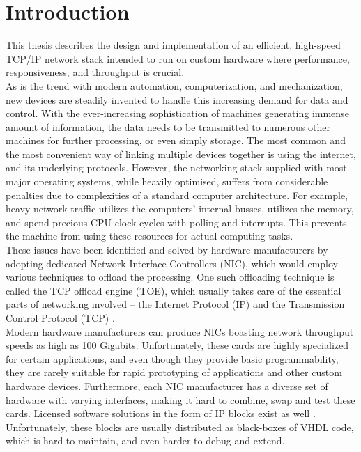 \chapter{Introduction}
This thesis describes the design and implementation of an efficient, high-speed
TCP/IP network stack intended to run on custom hardware where performance, responsiveness,
and throughput is crucial.\\

As is the trend with modern automation, computerization, and mechanization, new
devices are steadily invented to handle this increasing demand for data and
control.
With the ever-increasing sophistication of machines generating immense amount
of information, the data needs to be transmitted to numerous other machines for
further processing, or even simply storage. The most common and the most convenient
way of linking multiple devices together is using the internet, and its underlying
protocols. However, the networking stack supplied with most major operating
systems, while heavily optimised, suffers from considerable penalties due to
complexities of a standard computer architecture. For example, heavy network
traffic utilizes the computers' internal busses, utilizes the memory, and spend
precious CPU clock-cycles with polling and interrupts. This
prevents the machine from using these resources for actual computing tasks.\\
These issues have been identified and solved by hardware manufacturers by
adopting dedicated Network Interface Controllers (NIC), which would employ
various techniques to offload the processing. One such offloading technique is
called the TCP offload engine (TOE), which usually takes care of the essential
parts of networking involved -- the Internet Protocol (IP) and the Transmission
Control Protocol (TCP) \cite{TCP_offload_dumb_idea}.\\
Modern hardware manufacturers can produce NICs boasting network throughput
speeds as high as 100 Gigabits\cite{xilinx_100g_nic}. Unfortunately, these cards
are highly specialized for certain applications, and even though they provide
basic programmability, they are rarely suitable for rapid prototyping of
applications and other custom hardware devices. Furthermore, each NIC manufacturer
has a diverse set of hardware with varying interfaces, making it hard to
combine, swap and test these cards.
Licensed software solutions in the form of IP blocks exist as well
\cite{microtronix_ip_cores}\cite{avnet_ip_cores}. Unfortunately,
these blocks are usually distributed as black-boxes of VHDL code, which is
hard to maintain, and even harder to debug and extend\cite{opencores_mission}.\\

